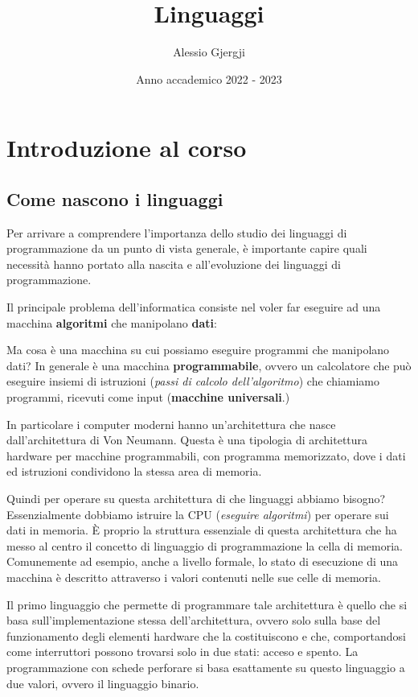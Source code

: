 \documentclass[oneside,a4paper,11pt]{book}
\title{Linguaggi}
\author{Alessio Gjergji}
\date{Anno accademico 2022 - 2023}
\theoremstyle{italicstyle}
\theoremstyle{normStyle}
\begin{document}
\hypersetup{ %
    linktoc=all,     %
    linkcolor=black,  %
}
\maketitle
\tableofcontents
\chapter{Introduzione al corso}
\section{Come nascono i linguaggi}
Per arrivare a comprendere l'importanza dello studio dei linguaggi 
di programmazione da un punto di vista generale, è importante 
capire quali necessità hanno portato alla nascita e all'evoluzione 
dei linguaggi di programmazione.

Il principale problema dell'informatica consiste nel voler far eseguire 
ad una macchina \textbf{algoritmi} che manipolano \textbf{dati}:

Ma cosa è una macchina su cui possiamo eseguire programmi che 
manipolano dati? In generale è una macchina \textbf{programmabile}, 
ovvero un calcolatore che può eseguire insiemi di istruzioni (\textit{passi 
di calcolo dell'algoritmo}) che chiamiamo programmi, ricevuti come input (\textbf{macchine 
universali}.)

In particolare i computer moderni hanno un'architettura che nasce 
dall'architettura di Von Neumann. Questa è una tipologia di architettura 
hardware per macchine programmabili, con programma memorizzato, dove 
i dati ed istruzioni condividono la stessa area di memoria. 

Quindi per operare su questa architettura di che linguaggi abbiamo 
bisogno? Essenzialmente dobbiamo istruire la CPU (\textit{eseguire algoritmi}) 
per operare sui dati in memoria. È proprio la struttura essenziale di 
questa architettura che ha messo al centro il concetto di linguaggio 
di programmazione la cella di memoria. Comunemente ad esempio, anche 
a livello formale, lo stato di esecuzione di una macchina è descritto attraverso 
i valori contenuti nelle sue celle di memoria.

Il primo linguaggio che permette di programmare tale architettura è 
quello che si basa sull'implementazione stessa dell'architettura, ovvero solo 
sulla base del funzionamento degli elementi hardware che la costituiscono e che, comportandosi
come interruttori possono trovarsi solo in due stati: acceso e spento. La programmazione 
con schede perforare si basa esattamente su questo linguaggio a due valori, ovvero il 
linguaggio binario.
\end{document}
